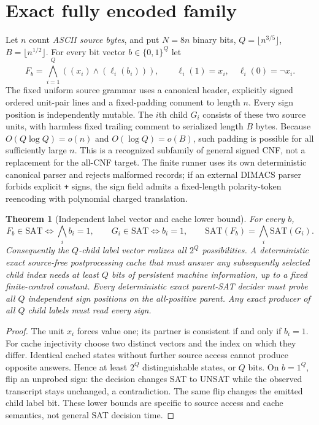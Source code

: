\documentclass[11pt]{article}
\newtheorem{theorem}{Theorem}
\begin{document}
\section*{Exact fully encoded family}
Let $n$ count \emph{ASCII source bytes}, and put $N=8n$ binary bits, $Q=\lfloor n^{3/5}\rfloor$, $B=\lfloor n^{1/2}\rfloor$. For every bit vector $b\in\{0,1\}^Q$ let
\[
F_b=\bigwedge_{i=1}^{Q}\left((x_i)\land(\ell_i(b_i))\right),
\qquad \ell_i(1)=x_i,\quad\ell_i(0)=\neg x_i.
\]
The fixed uniform source grammar uses a canonical header, explicitly signed ordered unit-pair lines and a fixed-padding comment to length $n$. Every sign position is independently mutable. The $i$th child $G_i$ consists of these two source units, with harmless fixed trailing comment to serialized length $B$ bytes. Because $O(Q\log Q)=o(n)$ and $O(\log Q)=o(B)$, such padding is possible for all sufficiently large $n$. This is a recognized subfamily of general signed CNF, not a replacement for the all-CNF target. The finite runner uses its own deterministic canonical parser and rejects malformed records; if an external DIMACS parser forbids explicit \texttt{+} signs, the sign field admits a fixed-length polarity-token reencoding with polynomial charged translation.

\begin{theorem}[Independent label vector and cache lower bound]
For every $b$,
\[
F_b\in\mathrm{SAT}\iff\bigwedge_i b_i=1,\qquad
G_i\in\mathrm{SAT}\iff b_i=1,\qquad
\mathrm{SAT}(F_b)=\bigwedge_i\mathrm{SAT}(G_i).
\]
Consequently the $Q$-child label vector realizes all $2^Q$ possibilities. A deterministic exact \emph{source-free} postprocessing cache that must answer any subsequently selected child index needs at least $Q$ bits of persistent machine information, up to a fixed finite-control constant. Every deterministic exact parent-SAT decider must probe all $Q$ independent sign positions on the all-positive parent. Any exact producer of all $Q$ child labels must read every sign.
\end{theorem}
\begin{proof}
The unit $x_i$ forces value one; its partner is consistent if and only if $b_i=1$. For cache injectivity choose two distinct vectors and the index on which they differ. Identical cached states without further source access cannot produce opposite answers. Hence at least $2^Q$ distinguishable states, or $Q$ bits. On $b=1^Q$, flip an unprobed sign: the decision changes SAT to UNSAT while the observed transcript stays unchanged, a contradiction. The same flip changes the emitted child label bit. These lower bounds are specific to source access and cache semantics, not general SAT decision time.
\end{proof}
\end{document}
